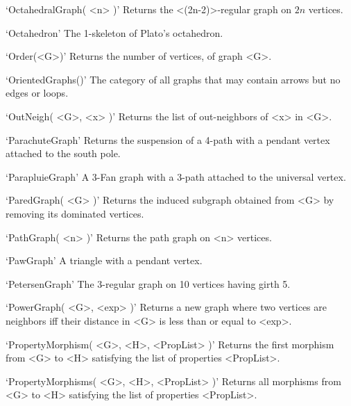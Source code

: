 `OctahedralGraph( <n> )'\newline\hglue 5mm 
Returns the <(2n-2)>-regular graph on $2n$ vertices.

`Octahedron'\newline\hglue 5mm 
The 1-skeleton of Plato's octahedron.

`Order(<G>)'\newline\hglue 5mm 
Returns the number of vertices, of graph <G>.

`OrientedGraphs()'\newline\hglue 5mm 
The category of all graphs that may contain arrows but no edges or loops.

`OutNeigh( <G>, <x> )'\newline\hglue 5mm 
Returns the list of out-neighbors of <x> in <G>.

`ParachuteGraph'\newline\hglue 5mm 
Returns the suspension of a 4-path with a pendant vertex attached to the south pole.

`ParapluieGraph'\newline\hglue 5mm 
A 3-Fan graph with a 3-path attached to the universal vertex.

`ParedGraph( <G> )'\newline\hglue 5mm 
Returns the induced subgraph obtained from   <G>  by  removing  its  dominated  vertices.

`PathGraph( <n> )'\newline\hglue 5mm 
Returns the path graph on <n> vertices.

`PawGraph'\newline\hglue 5mm 
A triangle with a pendant vertex.

`PetersenGraph'\newline\hglue 5mm 
The 3-regular graph on 10 vertices having girth 5.

`PowerGraph( <G>, <exp> )'\newline\hglue 5mm 
Returns a new graph where two vertices are neighbors iff their distance in <G> is less than or equal to <exp>.

`PropertyMorphism( <G>, <H>, <PropList> )'\newline\hglue 5mm 
Returns  the  first  morphism from <G> to <H> satisfying the list of properties <PropList>.

`PropertyMorphisms( <G>, <H>, <PropList> )'\newline\hglue 5mm 
Returns all morphisms from <G> to <H> satisfying the list of properties <PropList>.

